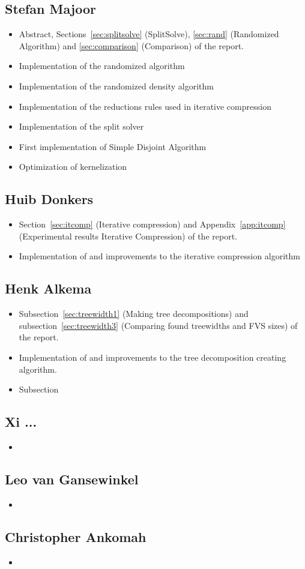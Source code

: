 \subsection{Stefan Majoor}
\begin{itemize}
 \item Abstract, Sections~\ref{sec:splitsolve} (SplitSolve), \ref{sec:rand} (Randomized Algorithm) and \ref{sec:comparison} (Comparison) of the report.
 \item Implementation of the randomized algorithm
 \item Implementation of the randomized density algorithm
 \item Implementation of the reductions rules used in iterative compression
 \item Implementation of the split solver
 \item First implementation of Simple Disjoint Algorithm
 \item Optimization of kernelization
\end{itemize}

\subsection{Huib Donkers}
\begin{itemize}
 \item Section~\ref{sec:itcomp} (Iterative compression) and Appendix~\ref{app:itcomp} (Experimental results Iterative Compression) of the report.
 \item Implementation of and improvements to the iterative compression algorithm
\end{itemize}

\subsection{Henk Alkema}
\begin{itemize}
 \item Subsection~\ref{sec:treewidth1} (Making tree decompositions) and subsection~\ref{sec:treewidth3} (Comparing found treewidths and FVS sizes) of the report.
 \item Implementation of and improvements to the tree decomposition creating algorithm.
 \item Subsection
\end{itemize}

\subsection{Xi ...}
\begin{itemize}
 \item 
\end{itemize}

\subsection{Leo van Gansewinkel}
\begin{itemize}
 \item 
\end{itemize}

\subsection{Christopher Ankomah}
\begin{itemize}
 \item 
\end{itemize}

